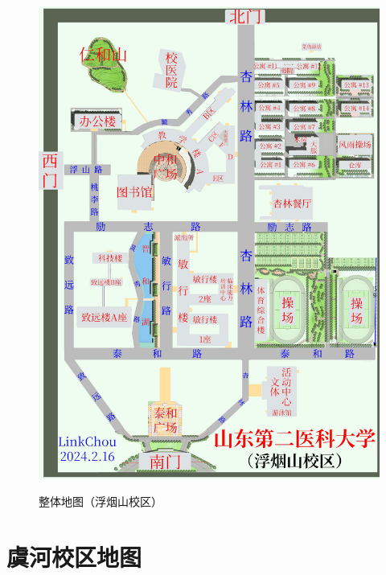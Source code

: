 \newpage
\noindent\begin{figure}[H]
    \centering
    \caption[map_all]{整体地图（浮烟山校区）}
    \vspace{1em}
    \noindent\includegraphics*[width = \linewidth]{浮烟山校区整体地图.pdf}
    \label{map_a}
\end{figure}

\newpage
\noindent\section[虞河校区地图]{虞河校区地图}

